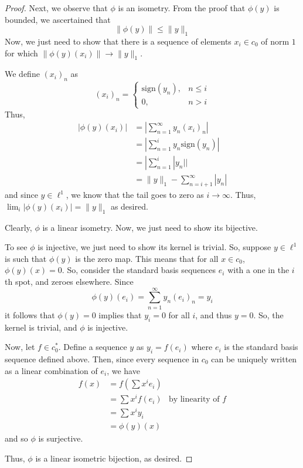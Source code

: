 \documentclass[fontsize=11pt]{scrartcl} %
\numberwithin{equation}{section} %
\numberwithin{figure}{section} %
\numberwithin{table}{section} %
\begin{document}
\begin{proof}
    Next, we observe that $\phi$ is an isometry. From the proof that $\phi(y)$
    is bounded, we ascertained that
    \[
        \|\phi(y)\|\leq \|y\|_1
    \]
    Now, we just need to show that there is a sequence of elements $x_i\in
    c_0$ of norm $1$ for which
    $\|\phi(y)(x_i)\| \to\|y\|_1$.

    We define $(x_i)_n$ as
    \[
        (x_i)_n =
        \begin{cases}
            \text{sign}(y_n), &n\leq i\\
            0, &n>i
        \end{cases}
    \]
    Thus,
    \[
        \begin{aligned}
            |\phi(y)(x_i)| &= |\sum_{n=1}^{\infty}y_n(x_i)_n|\\
            &= |\sum_{n=1}^{i}y_n\text{sign}(y_n)|\\
            &= |\sum_{n=1}^i |y_n||\\
            &= \|y\|_1 - \sum_{n=i+1}^{\infty}|y_n|
    \end{aligned}
    \]
    and since $y\in\ell^1$, we know that the tail goes to zero as $i\to\infty$.
    Thus, $\lim_i |\phi(y)(x_i)| =\|y\|_1$ as desired.

    Clearly, $\phi$ is a linear isometry. Now, we just need to show its
    bijective.

    To see $\phi$ is injective, we just need to show its kernel is trivial. So,
    suppose $y\in \ell^1$ is such that $\phi(y)$ is the zero map. This means
    that for all $x\in c_0$, $\phi(y)(x) = 0$. So, consider the standard basis
    sequences $e_i$ with a one in the $i$th spot, and zeroes elsewhere. Since
    \[
        \phi(y)(e_i) = \sum_{n=1}^{\infty}y_n(e_i)_n = y_i
    \]
    it follows that $\phi(y) = 0$ implies that $y_i=0$ for all $i$, and thus
    $y=0$. So, the kernel is trivial, and $\phi$ is injective.

    Now, let $f\in c_0^*$. Define a sequence $y$ as $y_i = f(e_i)$ where $e_i$
    is the standard basis sequence defined above. Then, since every sequence in
    $c_0$ can be uniquely written as a linear combination of $e_i$, we have
    \[
        \begin{aligned}
            f(x) &= f(\sum x^ie_i)\\
            &= \sum x^if(e_i) &\text{by linearity of $f$}\\
            &= \sum x^iy_i\\
            &= \phi(y)(x)
        \end{aligned}
    \]
    and so $\phi$ is surjective.

    Thus, $\phi$ is a linear isometric bijection, as desired.
\end{proof}
\end{document}
